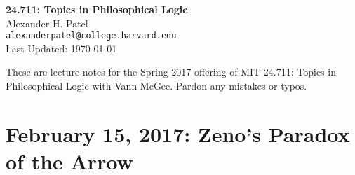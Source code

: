 \documentclass[12pt]{article}
\theoremstyle{definition}
\begin{document}
\begin{center}
\textbf{24.711: Topics in Philosophical Logic} \\
Alexander H. Patel \\
{\tt alexanderpatel@college.harvard.edu} \\
Last Updated: \today
\end{center}

These are lecture notes for the Spring 2017 offering of MIT 24.711: Topics in
Philosophical Logic with Vann McGee. Pardon any mistakes or typos.

\tableofcontents

\section{February 15, 2017: Zeno's Paradox of the Arrow}
\end{document}
